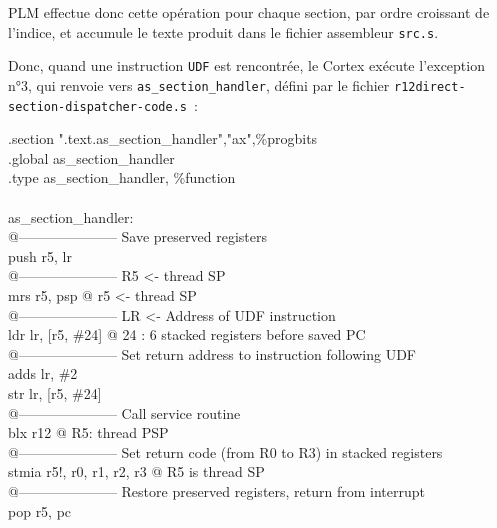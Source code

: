 PLM effectue donc cette opération pour chaque section, par ordre croissant de l'indice, et accumule le texte produit dans le fichier assembleur \texttt{src.s}.

Donc, quand une instruction \texttt{UDF} est rencontrée, le Cortex exécute l'exception n°3, qui renvoie vers \texttt{as\_section\_handler}, défini par le fichier \texttt{r12direct-section-dispatcher-code.s}~:

\begin{SHELL}\small
\hspace*{1.2em}.section	".text.as\_section\_handler","ax",\%progbits\\
\hspace*{1.2em}.global as\_section\_handler\\
\hspace*{1.2em}.type as\_section\_handler, \%function\\
\\
as\_section\_handler:\\
@--------------------- Save preserved registers\\
\hspace*{1.2em}push  {r5, lr}\\
@--------------------- R5 <- thread SP\\
\hspace*{1.2em}mrs   r5, psp           @ r5 <- thread SP\\
@--------------------- LR <- Address of UDF instruction\\
\hspace*{1.2em}ldr   lr, [r5, \#24]     @ 24 : 6 stacked registers before saved PC\\
@--------------------- Set return address to instruction following UDF\\
\hspace*{1.2em}adds  lr, \#2\\
\hspace*{1.2em}str   lr, [r5, \#24]\\
@--------------------- Call service routine\\
\hspace*{1.2em}blx   r12                      @ R5: thread PSP\\
@--------------------- Set return code (from R0 to R3) in stacked registers\\
\hspace*{1.2em}stmia r5!, {r0, r1, r2, r3}    @ R5 is thread SP\\
@--------------------- Restore preserved registers, return from interrupt\\
\hspace*{1.2em}pop   {r5, pc}
\end{SHELL}

